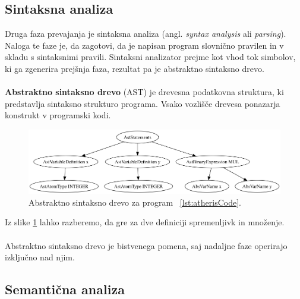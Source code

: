 \documentclass[a4paper, 12p]{book}
\begin{document}
\subsection{Sintaksna analiza}

Druga faza prevajanja je sintaksna analiza (angl. \textit{syntax analysis} ali \textit{parsing}). Naloga te faze je, da zagotovi, da je napisan program slovnično pravilen in v skladu s sintaksnimi pravili. Sintaksni analizator prejme kot vhod tok simbolov, ki ga zgenerira prejšnja faza, rezultat pa je abstraktno sintaksno drevo. \\\\
\indent\textbf{Abstraktno sintaksno drevo} (AST) je drevesna podatkovna struktura, ki predstavlja sintaksno strukturo programa. Vsako vozlišče drevesa ponazarja konstrukt v programski kodi.\\

\begin{figure}[h]
	\begin{center}
		\includegraphics[width=1\textwidth]{resources/ast.png}
	\end{center}
	\caption{Abstraktno sintaksno drevo za program ~\ref{lst:atherisCode}.}
	\label{image:abstractSyntaxTree}
\end{figure}

Iz slike \ref{image:abstractSyntaxTree} lahko razberemo, da gre za dve definiciji spremenljivk in množenje.\\\\
\indent Abstraktno sintaksno drevo je bistvenega pomena, saj nadaljne faze operirajo izključno nad njim.

\subsection{Semantična analiza} \label{semanSection}
\end{document}
